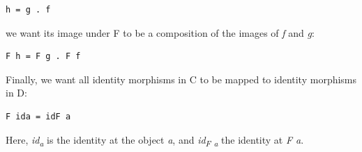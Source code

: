 \begin{verbatim}
h = g . f
\end{verbatim}
we want its image under F to be a composition of the images of \emph{f}
and \emph{g}:

\begin{verbatim}
F h = F g . F f
\end{verbatim}

\begin{figure}[H]
\centering
{}
\end{figure}

\noindent
Finally, we
want all identity morphisms in C to be mapped to identity morphisms in
D:

\begin{verbatim}
F ida = idF a
\end{verbatim}
Here, \emph{id\textsubscript{a}} is the identity at the object \emph{a},
and \emph{id\textsubscript{F a}} the identity at \emph{F a}.

\begin{figure}
\centering
{}
\end{figure}

